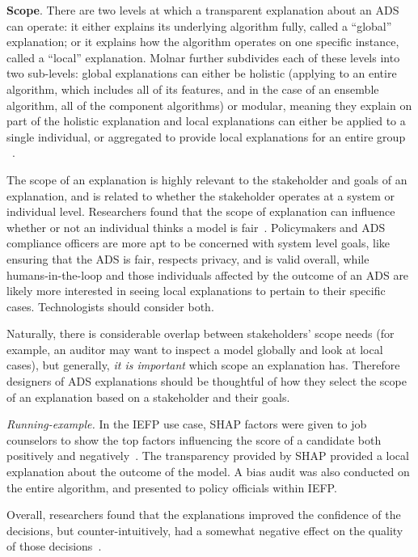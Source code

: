 \textbf{Scope}\label{subsec:scope}. There are two levels at which a transparent explanation about an ADS can operate:  it either explains its underlying algorithm fully, called a ``global'' explanation; or it explains how the algorithm operates on one specific instance, called a ``local'' explanation. Molnar further subdivides each of these levels into two sub-levels: global explanations can either be holistic (applying to an entire algorithm, which includes all of its features, and in the case of an ensemble algorithm, all of the component algorithms) or modular, meaning they explain on part of the holistic explanation and local explanations can either be applied to a single individual, or aggregated to provide local explanations for an entire group ~\cite{molnar2019}.

The scope of an explanation is highly relevant to the stakeholder and goals of an explanation, and is related to whether the stakeholder operates at a system or individual level. Researchers found that the scope of explanation can influence whether or not an individual thinks a model is fair~\cite{DBLP:journals/corr/abs-2101-09429,DBLP:conf/chi/LiaoGM20}. Policymakers and ADS compliance officers are more apt to be concerned with system level goals, like ensuring that the ADS is fair, respects privacy, and is valid overall, while humans-in-the-loop and those individuals affected by the outcome of an ADS are likely more interested in seeing local explanations to pertain to their specific cases. Technologists should consider both.

Naturally, there is considerable overlap between stakeholders' scope needs (for example, an auditor may want to inspect a model globally and look at local cases), but generally, \textit{it is important} which scope an explanation has.  Therefore designers of ADS explanations should be thoughtful of how they select the scope of an explanation based on a stakeholder and their goals.

\emph{Running-example.} In the IEFP use case, SHAP factors were given to job counselors to show the top factors influencing the score of a candidate both positively and negatively~\cite{zejnilovic2020algorithmic}. The transparency provided by SHAP provided a local explanation about the outcome of the model. A bias audit was also conducted on the entire algorithm, and presented to policy officials within IEFP.

Overall, researchers found that the explanations improved the confidence of the decisions, but counter-intuitively, had a somewhat negative effect on the quality of those decisions~\cite{zejnilovic2020algorithmic}.


